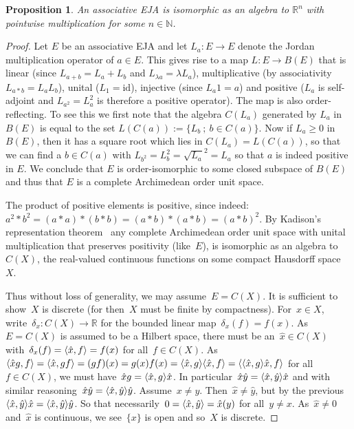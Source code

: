 \documentclass[submission,copyright,creativecommons]{eptcs}
\newcounter{main}
\newtheorem{proposition}[main]{Proposition}
\theoremstyle{definition}
\DeclarePairedDelimiter{\inn}{\langle}{\rangle}
\newcommand{\id}{\mathrm{id}}
\newcommand\R{\mathbb{R}}
\newcommand\N{\mathbb{N}}
\begin{document}
\begin{proposition}\label{prop:associsdisc}
    An associative EJA is isomorphic as an algebra to $\R^n$ with pointwise multiplication for some $n\in \N$.
\end{proposition}
\begin{proof}
    Let $E$ be an associative EJA and let $L_a:E\rightarrow E$ denote the Jordan multiplication operator of $a\in E$. This gives rise to a map $L:E\rightarrow B(E)$ that is linear (since $L_{a+b}=L_a+L_b$ and $L_{\lambda a} = \lambda L_a$), multiplicative (by associativity $L_{a*b} = L_aL_b$), unital ($L_1=\id$), injective (since $L_a1 = a$) and positive ($L_a$ is self-adjoint and $L_{a^2} = L_a^2$ is therefore a positive operator). The map is also order-reflecting. To see this we first note that the algebra $C(L_a)$ generated by $L_a$ in $B(E)$ is equal to the set $L(C(a)):=\{L_b~;~b\in C(a)\}$. Now if $L_a\geq 0$ in $B(E)$, then it has a square root which lies in $C(L_a)=L(C(a))$, so that we can find a $b\in C(a)$ with $L_{b^2}=L_b^2 = \sqrt{L_a}^2 = L_a$ so that $a$ is indeed positive in $E$. We conclude that $E$ is order-isomorphic to some closed subspace of $B(E)$ and thus that $E$ is a complete Archimedean order unit space.

    The product of positive elements is positive, since
    indeed: $a^2*b^2 = (a*a)*(b*b) = (a*b)*(a*b) = (a*b)^2$.
    By Kadison's representation theorem~\cite{kadison1951representation}
        any complete Archimedean order unit space with unital multiplication
        that preserves positivity (like~$E$), is isomorphic as an algebra
        to~$C(X)$, the real-valued continuous functions on some
            compact Hausdorff space~$X$.

    Thus without loss of generality, we may assume~$E = C(X)$.
    It is sufficient to show~$X$ is discrete (for then~$X$
        must be finite by compactness).
    For~$x \in X$, write~$\delta_x \colon C(X) \to \R$ for
        the bounded linear map~$\delta_x(f)= f(x)$.
    As~$E=C(X)$ is assumed to be a Hilbert space,
        there must be an~$\hat{x} \in C(X)$
        with~$\delta_x(f) = \inn{\hat{x},f} = f(x)$ for all~$f \in C(X)$.
    As~$\inn{\hat{x}g,f} = \inn{\hat{x},gf}
    = (gf)(x) = g(x)f(x) = \inn{\hat{x},g}\inn{\hat{x},f} =
    \inn{\inn{\hat{x},g}\hat{x},f}$ for all~$f \in C(X)$,
    we must have~$\hat{x}g = \inn{\hat{x},g}\hat{x}$.
    In particular~$\hat{x}\hat{y} = \inn{\hat{x},\hat{y}}\hat{x}$
    and with similar reasoning~$\hat{x}\hat{y} = \inn{\hat{x},\hat{y}}\hat{y}$.
    Assume~$x\neq y$.
    Then~$\hat{x} \neq \hat{y}$, but by the
        previous~$\inn{\hat{x},\hat{y}} \hat{x} =  \inn{\hat{x},\hat{y}} \hat{y}$.
        So that necessarily~$0 = \inn{\hat{x},\hat{y}}=\hat{x}(y)$ for all~$y \neq x$.
        As~$\hat{x} \neq 0$ and~$\hat{x}$ is continuous,
            we see~$\{x\}$ is open and so~$X$ is discrete.
\end{proof}
\end{document}
